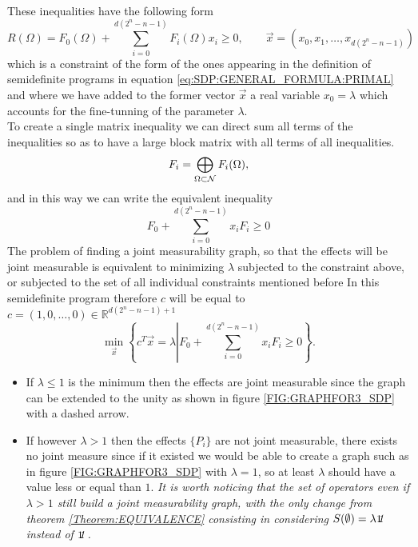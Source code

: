 \documentclass[10pt, a4paper]{amsart}
\begin{document}
These inequalities have the following form 
$$
R(\Omega ) 
=
F_{0}(\Omega) + \sum_{i=0}^{d(2^{n}-n-1)}F_{i}(\Omega)x_{i}\geq 0, \qquad \vec{x} = (x_{0},x_{1}, \ldots , x_{d(2^{n}-n-1)})
$$
which is a constraint of the form of the ones appearing in the definition of semidefinite programs in equation \ref{eq:SDP:GENERAL_FORMULA:PRIMAL} and where we have added to the former vector $\vec{x}$ a real variable $x_{0} = \lambda$ which accounts for the fine-tunning of the parameter $\lambda$. \\

To create a single matrix inequality we can direct sum all terms of the inequalities so as to have 
a large block matrix with all terms of all inequalities. 
$$
F_{i} = \bigoplus_{\Omega \subset \mathcal{N}} F_{i}(\Omega),
$$
and in this way we can write the equivalent inequality 
$$
F_{0} + \sum_{i = 0}^{d(2^{n}-n-1)}x_{i}F_{i}\geq 0
$$
The problem of finding a joint measurability graph, so that the effects will be joint measurable is equivalent to minimizing
$\lambda $ subjected to the constraint above, or subjected to the set of all individual constraints mentioned before In this semidefinite program therefore $c$ will be equal to  $c = (1, 0 , \ldots, 0)\in \mathbb{R}^{d(2^{n}-n-1)+1}$
$$
\min_{\vec{x}} \left \{
c^{T}\vec{x} = \lambda
\left |  
F_{0} + \sum_{i = 0}^{d(2^{n}-n-1)}x_{i}F_{i}\geq 0
\right .
\right \}.
$$
\begin{itemize}
\item If  $\lambda \leq 1$ is the minimum then the effects are joint measurable since the graph can be extended to the unity as shown in figure \ref{FIG:GRAPHFOR3_SDP} with a dashed arrow.   
\item If however $\lambda > 1$ then the  effects $\{P_{i}\}$ are not joint measurable, there exists no joint measure since if it existed we would be able to create a graph such as in figure \ref{FIG:GRAPHFOR3_SDP} with $\lambda = 1$, so at least $\lambda $ should have a value less or equal than $1$.
\textit{It is worth noticing that the set of operators even if $\lambda > 1$ still build a joint measurability graph, with the only change from theorem \ref{Theorem:EQUIVALENCE} consisting in considering $S(\emptyset) = \lambda \mathit{\bbone} $ instead of $\mathit{\bbone} $.  }
\end{itemize}
\end{document}
